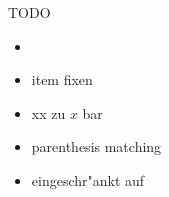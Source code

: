 \documentclass[class=article, crop=false]{standalone}
\begin{document}
\begin{zettel}{TODO}
    \begin{itemize}
        \item \R
        \item item fixen
        \item xx zu $x$ bar
        \item parenthesis matching
        \item eingeschr"ankt auf
    \end{itemize}
\end{zettel}
\end{document}
